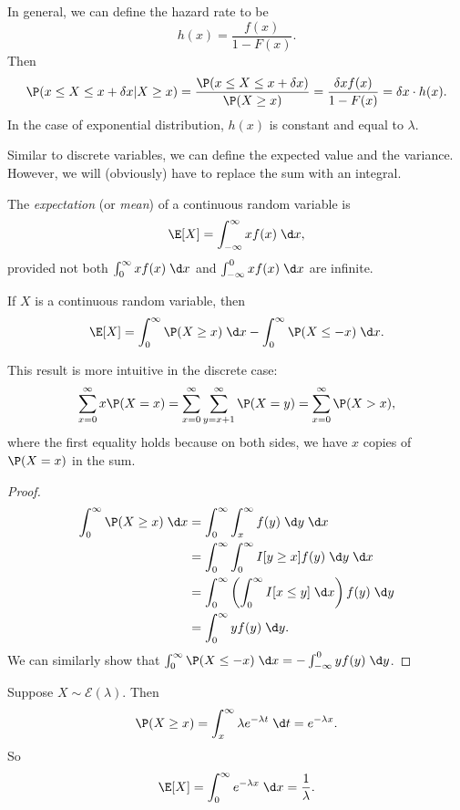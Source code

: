 \documentclass[a4paper]{article}
\begin{document}
In general, we can define the hazard rate to be
\[
  h(x) = \frac{f(x)}{1 - F(x)}.
\]
Then
\[
  \P(x \leq X \leq x + \delta x | X \geq x) = \frac{\P(x \leq X \leq x + \delta x)}{\P(X \geq x)} = \frac{\delta x f(x)}{1 - F(x)} = \delta x\cdot h(x).
\]
In the case of exponential distribution, $h(x)$ is constant and equal to $\lambda$.

Similar to discrete variables, we can define the expected value and the variance. However, we will (obviously) have to replace the sum with an integral.
\begin{defi}[Expectation]
  The \emph{expectation} (or \emph{mean}) of a continuous random variable is
  \[
    \E[X] = \int_{-\infty}^\infty xf(x) \;\d x,
  \]
  provided not both $\int_0^\infty xf(x)\;\d x$ and $\int_{-\infty}^0 xf(x) \;\d x$ are infinite.
\end{defi}

\begin{thm}
  If $X$ is a continuous random variable, then
  \[
    \E[X] = \int_0^\infty \P(X \geq x)\;\d x - \int_0^\infty \P(X \leq -x)\;\d x.
  \]
\end{thm}
This result is more intuitive in the discrete case:
\[
  \sum_{x = 0}^\infty x \P(X = x) = \sum_{x = 0}^\infty \sum_{y = x + 1}^\infty \P(X = y) = \sum_{x = 0}^\infty \P(X > x),
\]
where the first equality holds because on both sides, we have $x$ copies of $\P(X = x)$ in the sum.

\begin{proof}
  \begin{align*}
    \int_0^\infty \P(X \geq x)\;\d x &= \int_0^\infty \int_x^\infty f(y)\;\d y\;\d x\\
    &= \int_0^\infty \int_0^\infty I[y\geq x]f(y)\;\d y\;\d x\\
    &= \int_0^\infty \left(\int_0^\infty I[x\leq y]\;\d x\right) f(y)\;\d y\\
    &= \int_0^\infty yf(y)\;\d y.
  \end{align*}
  We can similarly show that $\int_0^\infty \P(X \leq -x)\;\d x = -\int_{-\infty}^0 yf(y)\;\d y$.
\end{proof}

\begin{eg}
  Suppose $X\sim \mathcal{E}(\lambda)$. Then
  \[
    \P(X \geq x) = \int_x^{\infty} \lambda e^{-\lambda t}\;\d t = e^{-\lambda x}.
  \]
  So
  \[
    \E[X] = \int_0^\infty e^{-\lambda x}\;\d x = \frac{1}{\lambda}.
  \]
\end{eg}
\end{document}
